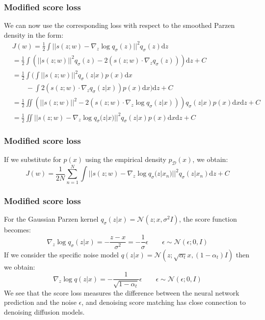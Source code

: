 \documentclass{beamer}
\begin{document}
\begin{frame}
    \frametitle{Modified score loss}
    We can now use the corresponding loss with respect to the smoothed Parzen density in the form:
    \begin{align*}
        &J(w)=\frac{1}{2}\int||s(z;w)-\nabla_{z}\log{}q_{\sigma}(z)||^{2}q_{\sigma}(z)\mathrm{d}z \\
        &=\frac{1}{2}\int(||s(z;w)||^{2}q_{\sigma}(z)-2(s(z;w)\cdot\nabla_{z}q_{\sigma}(z)))\mathrm{d}z+C \\
        &=\frac{1}{2}\int\bigg(\int||s(z;w)||^{2}q_{\sigma}(z|x)p(x)\mathrm{d}x \\
        &\qquad-\int{}2(s(z;w)\cdot\nabla_{z}q_{\sigma}(z|x))p(x)\mathrm{d}x\bigg)\mathrm{d}z+C \\
        &=\frac{1}{2}\iint(||s(z;w)||^{2}-2(s(z;w)\cdot\nabla_{z}\log{}q_{\sigma}(z|x)))q_{\sigma}(z|x)p(x)\mathrm{d}x\mathrm{d}z+C \\
        &=\frac{1}{2}\iint||s(z;w)-\nabla_{z}\log{}q_{\sigma}(z|x)||^{2}q_{\sigma}(z|x)p(x)\mathrm{d}x\mathrm{d}z+C
    \end{align*}
\end{frame}

\begin{frame}
    \frametitle{Modified score loss}
    If we substitute for $p(x)$ using the empirical density $p_{\mathcal{D}}(x)$, we obtain:
    \begin{equation*}
        J(w)=\frac{1}{2N}\sum_{n=1}^{N}\int||s(z;w)-\nabla_{z}\log{}q_{\sigma}(z|x_{n})||^{2}q_{\sigma}(z|x_{n})\mathrm{d}z+C
    \end{equation*}
\end{frame}

\begin{frame}
    \frametitle{Modified score loss}
    For the Gaussian Parzen kernel $q_{\sigma}(z|x)=\mathcal{N}(z;x,\sigma^{2}I)$, the score function becomes:
    \begin{equation*}
        \nabla_{z}\log{}q_{\sigma}(z|x)=-\frac{z-x}{\sigma^{2}}=-\frac{1}{\sigma}\epsilon\qquad\epsilon\sim\mathcal{N}(\epsilon;0,I)
    \end{equation*}
    If we consider the specific noise model $q(z|x)=\mathcal{N}(z;\sqrt{\alpha_{t}}x,(1-\alpha_{t})I)$ then we obtain:
    \begin{equation*}
        \nabla_{z}\log{}q(z|x)=-\frac{1}{\sqrt{1-\alpha_{t}}}\epsilon\qquad\epsilon\sim\mathcal{N}(\epsilon;0,I)
    \end{equation*}
    We see that the score loss measures the difference between the neural network prediction and the noise $\epsilon$, and denoising score matching has close connection to denoising diffusion models.
\end{frame}
\end{document}
